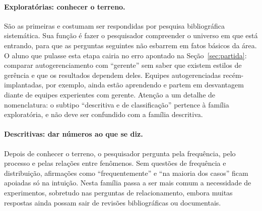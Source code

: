 \documentclass[10pt,a4paper]{extarticle}
\theoremstyle{definition}
\begin{document}
\paragraph{Exploratórias: conhecer o terreno.} São as primeiras e costumam ser respondidas por pesquisa bibliográfica sistemática. Sua função é fazer o pesquisador compreender o universo em que está entrando, para que as perguntas seguintes não esbarrem em fatos básicos da área. O aluno que pulasse esta etapa cairia no erro apontado na Seção~\ref{sec:partida}: comparar autogerenciamento com \enquote{gerente} sem saber que existem estilos de gerência e que os resultados dependem deles. Equipes autogerenciadas recém-implantadas, por exemplo, ainda estão aprendendo e partem em desvantagem diante de equipes experientes com gerente. Atenção a um detalhe de nomenclatura: o subtipo \enquote{descritiva e de classificação} pertence à família exploratória, e não deve ser confundido com a família descritiva.

\paragraph{Descritivas: dar números ao que se diz.} Depois de conhecer o terreno, o pesquisador pergunta pela frequência, pelo processo e pelas relações entre fenômenos. Sem questões de frequência e distribuição, afirmações como \enquote{frequentemente} e \enquote{na maioria dos casos} ficam apoiadas só na intuição. Nesta família passa a ser mais comum a necessidade de experimentos, sobretudo nas perguntas de relacionamento, embora muitas respostas ainda possam sair de revisões bibliográficas ou documentais.
\end{document}
